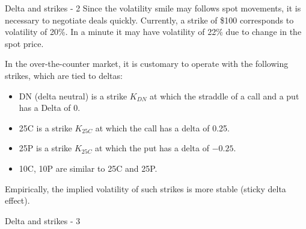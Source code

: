 \documentclass{beamer}
\begin{document}
\begin{frame}{Delta and strikes - 2}
\justify
Since the volatility smile may follows spot movements, it is necessary to negotiate deals quickly. Currently, a strike of \$100 corresponds to volatility of 20\%. In a minute it may have volatility of 22\% due to change in the spot price.

\justify
In the over-the-counter market, it is customary to operate with the following strikes, which are tied to deltas:
\begin{itemize}
\item DN (delta neutral) is a strike $K_{DN}$ at which the straddle of a call and a put has a Delta of 0.
\item 25C is a strike $K_{25C}$ at which the call has a delta of 0.25.
\item 25P is a strike $K_{25C}$ at which the put has a delta of $-0.25$.
\item 10C, 10P are similar to 25C and 25P.
\end{itemize}

\justify
Empirically, the implied volatility of such strikes is more stable (sticky delta effect).
\end{frame}



\newcommand{\drawVolNode}[4] {

	\node[
		circle,
		color=Set1-B,
		fill,
		inner sep=2pt
	] at (#1, #2) {};
	
	\node[anchor=#4] at (#1, #2) {$\sigma_{#3}$};
}

\begin{frame}{Delta and strikes - 3}
\centering
{}
\end{frame}
\end{document}
